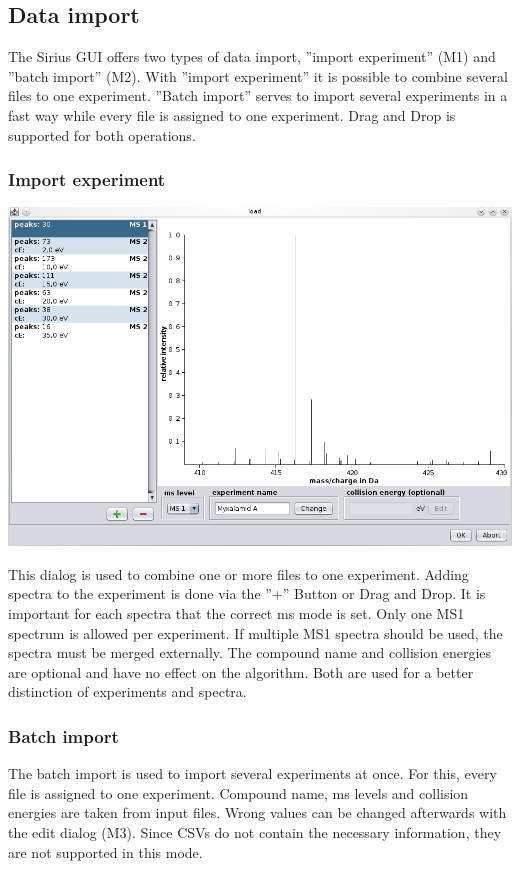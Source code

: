 \documentclass[a4paper,11pt]{article}
\begin{document}
 \subsection{Data import}
 
 The Sirius GUI offers two types of data import, ''import experiment'' (M1) and ''batch import'' (M2). 
 With ''import experiment'' it is possible to combine  several files to one experiment. 
 ''Batch import'' serves to import several experiments in a fast way while every file is assigned to one experiment. 
 Drag and Drop is supported for both operations.
 
 \subsubsection{Import experiment}
 \label{sec:import-experiment}
 
 \includegraphics[width=0.9\linewidth]{pics/load.png}
 
 This dialog is used to combine one or more files to one experiment. Adding spectra to the experiment is done via 
 the ''+'' Button or Drag and Drop. It is important for each spectra that the correct ms mode is set.  
 Only one MS1 spectrum is allowed per experiment. If multiple MS1 spectra should be used, the spectra must be merged externally.  
 The compound name and collision energies are optional and have no effect on the algorithm. 
 Both are used for a better distinction of experiments and spectra. 
 
 \subsubsection{Batch import}
 \label{sec:import-batch}
 
 The batch import is used to import several experiments at once. For this, every file is assigned to one experiment. 
 Compound name, ms levels and collision energies are taken from input files. Wrong values can be changed afterwards with the edit dialog (M3).  
 Since CSVs do not contain the necessary information, they are not supported in this mode.
 
\end{document}
